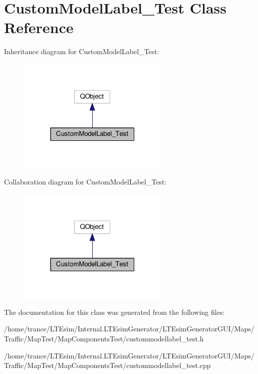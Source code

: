 \hypertarget{class_custom_model_label___test}{}\section{Custom\+Model\+Label\+\_\+\+Test Class Reference}
\label{class_custom_model_label___test}


Inheritance diagram for Custom\+Model\+Label\+\_\+\+Test\+:
\nopagebreak
\begin{figure}[H]
\begin{center}
\leavevmode
\includegraphics[width=205pt]{class_custom_model_label___test__inherit__graph}
\end{center}
\end{figure}


Collaboration diagram for Custom\+Model\+Label\+\_\+\+Test\+:
\nopagebreak
\begin{figure}[H]
\begin{center}
\leavevmode
\includegraphics[width=205pt]{class_custom_model_label___test__coll__graph}
\end{center}
\end{figure}


The documentation for this class was generated from the following files\+:\begin{DoxyCompactItemize}
\item 
/home/trance/\+L\+T\+Esim/\+Internal.\+L\+T\+Esim\+Generator/\+L\+T\+Esim\+Generator\+G\+U\+I/\+Maps/\+Traffic/\+Map\+Test/\+Map\+Components\+Test/custommodellabel\+\_\+test.\+h\item 
/home/trance/\+L\+T\+Esim/\+Internal.\+L\+T\+Esim\+Generator/\+L\+T\+Esim\+Generator\+G\+U\+I/\+Maps/\+Traffic/\+Map\+Test/\+Map\+Components\+Test/custommodellabel\+\_\+test.\+cpp\end{DoxyCompactItemize}

